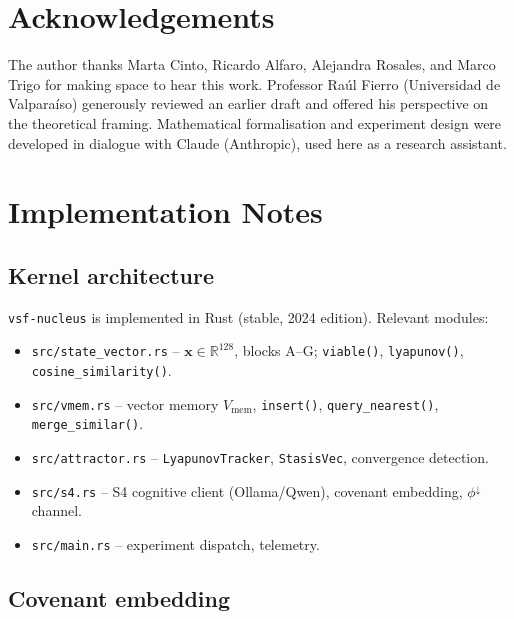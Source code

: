 \documentclass[11pt, a4paper]{article}
\newcommand{\R}{\mathbb{R}}
\newcommand{\sv}{\bm{x}}
\newcommand{\nucleus}{\texttt{vsf-nucleus}}
\begin{document}
\section*{Acknowledgements}

The author thanks Marta Cinto, Ricardo Alfaro, Alejandra Rosales, and Marco Trigo
for making space to hear this work.
Professor Ra\'{u}l Fierro (Universidad de Valpara\'{i}so) generously reviewed
an earlier draft and offered his perspective on the theoretical framing.
Mathematical formalisation and experiment design were developed in dialogue with
Claude (Anthropic), used here as a research assistant.






\appendix

\section{Implementation Notes}
\label{app:impl}

\subsection{Kernel architecture}

\nucleus{} is implemented in Rust (stable, 2024 edition).
Relevant modules:
\begin{itemize}
  \item \texttt{src/state\_vector.rs} -- $\sv \in \R^{128}$, blocks A--G;
        \texttt{viable()}, \texttt{lyapunov()},
        \texttt{cosine\_similarity()}.
  \item \texttt{src/vmem.rs} -- vector memory $V_\text{mem}$,
        \texttt{insert()}, \texttt{query\_nearest()}, \texttt{merge\_similar()}.
  \item \texttt{src/attractor.rs} -- \texttt{LyapunovTracker},
        \texttt{StasisVec}, convergence detection.
  \item \texttt{src/s4.rs} -- S4 cognitive client (Ollama/Qwen),
        covenant embedding, $\phi^\downarrow$ channel.
  \item \texttt{src/main.rs} -- experiment dispatch, telemetry.
\end{itemize}

\subsection{Covenant embedding}
\end{document}
